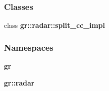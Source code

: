 \subsubsection*{Classes}
\begin{DoxyCompactItemize}
\item 
class {\bf gr\+::radar\+::split\+\_\+cc\+\_\+impl}
\end{DoxyCompactItemize}
\subsubsection*{Namespaces}
\begin{DoxyCompactItemize}
\item 
 {\bf gr}
\item 
 {\bf gr\+::radar}
\end{DoxyCompactItemize}
